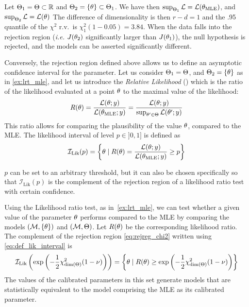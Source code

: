 \documentclass[../../Main_ManuscritThese.tex]{subfiles}
\begin{document}
\begin{example}
  \label{ex:lrt_mle}
  Let $\Theta_1 = \Theta\subset \mathbb{R}$ and $\Theta_2 = \{\theta\}\subset \Theta_1$.
  We have then $\sup_{\Theta_1} \mathcal{L} = \mathcal{L}({\theta}_{\mathrm{MLE}})$, and $\sup_{\Theta_2} \mathcal{L} = \mathcal{L}(\theta)$
 The difference of dimensionality is then $r-d=1$ and the .95 quantile of the $\chi^2$ r.v.\ is $\chi^2_1(1-0.05) =3.84$. When the data falls into the rejection region (\emph{i.e.} $J(\theta_2)$ significantly larger than $J({\theta}_1)$), the null hypothesis is rejected, and the models can be asserted significantly different. 
\end{example}



\label{sec:relative_likelihood}
Conversely, the rejection region defined above allows us to define an asymptotic confidence interval for the parameter. Let us consider $\Theta_1 = \Theta$, and $\Theta_2 = \{\theta\}$ as in \cref{ex:lrt_mle}, and let us introduce the \emph{Relative Likelihood} (\cite{kalbfleisch_probability_1985}) which is the ratio of the likelihood evaluated at a point $\theta$ to the maximal value of the likelihood:
\begin{equation}
  R(\theta) = \frac{\mathcal{L}(\theta;y)}{\mathcal{L}({\theta}_{\mathrm{MLE}};y)} = \frac{\mathcal{L}(\theta;y)}{\sup_{\theta^{\prime} \in \Theta}\mathcal{L}(\theta^{\prime};y)}
\end{equation}
This ratio allows for comparing the plausibility of the value $\theta$, compared to the MLE.
The likelihood interval of level $p\in ]0,1]$ is defined as
\begin{equation}
  \label{eq:def_lik_interval}
  \mathcal{I}_{\mathrm{Lik}}(p) = \left\{\theta \mid R(\theta)=\frac{\mathcal{L}(\theta;y)}{\mathcal{L}({\theta}_{\mathrm{MLE}};y)} \geq p\right\}
\end{equation}

$p$ can be set to an arbitrary threshold, but it can also be chosen specifically so that $\mathcal{I}_{\mathrm{Lik}}(p)$ is the complement of the rejection region of a likelihood ratio test with certain confidence.

Using the Likelihood ratio test, as in~\cref{ex:lrt_mle}, we can test whether a given value of the parameter $\theta$ performs compared to the MLE by comparing the models $(\mathcal{M}, \{\theta\})$ and $(\mathcal{M},\Theta)$. Let $R(\theta)$ be the corresponding likelihood ratio. The complement of the rejection region \cref{eq:rejreg_chi2} written using \cref{eq:def_lik_interval} is
\begin{equation}
  \label{eq:rel_lik_threshold}
  \mathcal{I}_{\mathrm{Lik}}\left(\exp\left(-\frac{1}{2}\chi^2_{\mathrm{dim}(\Theta)}(1-\nu)\right)\right) = \left\{\theta \mid R(\theta) \geq \exp\left(-\frac{1}{2}\chi^2_{\mathrm{dim}(\Theta)}(1-\nu)\right) \right\}
\end{equation}
The values of the calibrated parameters in this set generate models that are statistically equivalent to the model comprising the MLE as its calibrated parameter.
\end{document}
